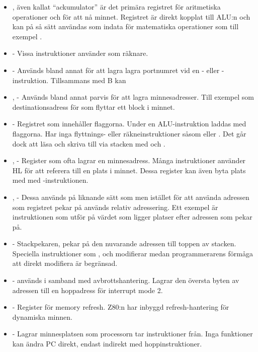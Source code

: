 \documentclass[main.tex]{subfiles}
\begin{document}
\begin{itemize}
    \item {}, även kallat ``ackumulator'' är det primära registret för
        aritmetiska operationer och för att nå minnet. Registret är direkt
        kopplat till ALU:n och kan på så sätt användas som indata för
        matematiska operationer som till exempel .
    \item {} - Vissa instruktioner använder  som räknare.
    \item {} - Används bland annat för att lagra lagra portnumret vid en
        - eller -instruktion. Tillsammans med B kan
    \item {},  - Används bland annat parvis för att lagra
        minnesadresser. Till exempel som destinationsadress för 
        som flyttar ett block i minnet.
    \item {} - Registret som innehåller flaggorna. Under en
        ALU-instruktion laddas  med flaggorna. Har inga flyttnings-
        eller räkneinstruktioner såsom  eller . Det går dock
        att läsa och skriva till  via stacken med  och
        .
    \item {},  - Register som ofta lagrar en minnesadress. Många instruktioner
        använder HL för att referera till en plats i minnet. Dessa register kan
        även byta plats med  med -instruktionen.
    \item {},  - Dessa används på liknande sätt som 
        men istället för att använda adressen som registret pekar på används
        relativ adressering. Ett exempel är instruktionen  som
        utför  på värdet som ligger  platser efter adressen
        som  pekar på.
    \item {} - Stackpekaren, pekar på den nuvarande adressen till toppen av
        stacken. Speciella instruktioner som ,  och
         modifierar  medan programmerarens förmåga att
        direkt modifiera  är begränsad.
    \item {} -  används i samband med avbrottshantering. Lagrar
        den översta byten av adressen till en hoppadress för interrupt mode
        2.
    \item {} - Register för memory refresh. Z80:n har inbyggd
        refresh-hantering för dynamiska minnen.
    \item {} - Lagrar minnesplatsen som processorn tar instruktioner
        från. Inga funktioner kan ändra PC direkt, endast indirekt med
        hoppinstruktioner.
\end{itemize}
\end{document}
